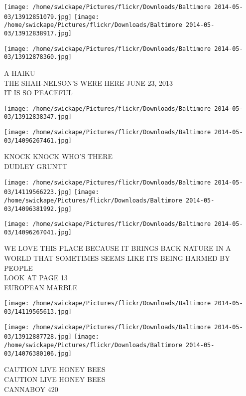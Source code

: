 \documentclass[10pt,letterpaper]{article}
\begin{document}
\texttt{[image: /home/swickape/Pictures/flickr/Downloads/Baltimore 2014-05-03/13912851079.jpg]}
\texttt{[image: /home/swickape/Pictures/flickr/Downloads/Baltimore 2014-05-03/13912838917.jpg]}

\vspace{0.25in}
\texttt{[image: /home/swickape/Pictures/flickr/Downloads/Baltimore 2014-05-03/13912878360.jpg]}

A HAIKU\\
THE SHAH{-}NELSON'S WERE HERE JUNE 23, 2013\\
IT IS SO PEACEFUL
\pagebreak

\texttt{[image: /home/swickape/Pictures/flickr/Downloads/Baltimore 2014-05-03/13912838347.jpg]}

\vspace{0.25in}
\texttt{[image: /home/swickape/Pictures/flickr/Downloads/Baltimore 2014-05-03/14096267461.jpg]}

KNOCK KNOCK WHO'S THERE\\
DUDLEY GRUNTT
\pagebreak

\texttt{[image: /home/swickape/Pictures/flickr/Downloads/Baltimore 2014-05-03/14119566223.jpg]}
\texttt{[image: /home/swickape/Pictures/flickr/Downloads/Baltimore 2014-05-03/14096381992.jpg]}

\vspace{0.25in}
\texttt{[image: /home/swickape/Pictures/flickr/Downloads/Baltimore 2014-05-03/14096267041.jpg]}

WE LOVE THIS PLACE BECAUSE IT BRINGS BACK NATURE IN A WORLD THAT SOMETIMES SEEMS LIKE ITS BEING HARMED BY PEOPLE\\
LOOK AT PAGE 13\\
EUROPEAN MARBLE
\pagebreak

\texttt{[image: /home/swickape/Pictures/flickr/Downloads/Baltimore 2014-05-03/14119565613.jpg]}

\vspace{0.25in}
\texttt{[image: /home/swickape/Pictures/flickr/Downloads/Baltimore 2014-05-03/13912887728.jpg]}
\texttt{[image: /home/swickape/Pictures/flickr/Downloads/Baltimore 2014-05-03/14076380106.jpg]}

CAUTION LIVE HONEY BEES\\
CAUTION LIVE HONEY BEES\\
CANNABOY 420
\pagebreak
\end{document}
